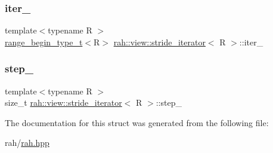 \subsubsection{\texorpdfstring{iter\_}{iter\_}}
{\footnotesize\ttfamily template$<$typename R $>$ \\
\mbox{\hyperlink{namespacerah_a28aff4eeddcece6be65ff0b956d32d4a}{range\+\_\+begin\+\_\+type\+\_\+t}}$<$R$>$ \mbox{\hyperlink{structrah_1_1view_1_1stride__iterator}{rah\+::view\+::stride\+\_\+iterator}}$<$ R $>$\+::iter\+\_\+}

\mbox{\label{structrah_1_1view_1_1stride__iterator_a1b2e6cfb0631cde24284f56b17a4452c}} 
\subsubsection{\texorpdfstring{step\_}{step\_}}
{\footnotesize\ttfamily template$<$typename R $>$ \\
size\+\_\+t \mbox{\hyperlink{structrah_1_1view_1_1stride__iterator}{rah\+::view\+::stride\+\_\+iterator}}$<$ R $>$\+::step\+\_\+}



The documentation for this struct was generated from the following file\+:\begin{DoxyCompactItemize}
\item 
rah/\mbox{\hyperlink{rah_8hpp}{rah.\+hpp}}\end{DoxyCompactItemize}
